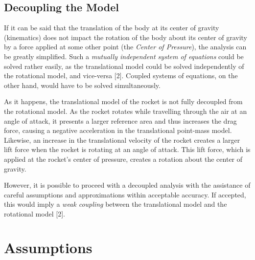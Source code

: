 \documentclass[]{book}
\begin{document}
\subsection{Decoupling the Model}\label{decoupling-the-model}

If it can be said that the translation of the body at its center of
gravity (kinematics) does not impact the rotation of the body about its
center of gravity by a force applied at some other point (the
\emph{Center of Pressure}), the analysis can be greatly simplified. Such
a \emph{mutually independent system of equations} could be solved rather
easily, as the translational model could be solved independently of the
rotational model, and vice-versa {[}2{]}. Coupled systems of equations,
on the other hand, would have to be solved simultaneously.

As it happens, the translational model of the rocket is not fully
decoupled from the rotational model. As the rocket rotates while
travelling through the air at an angle of attack, it presents a larger
reference area and thus increases the drag force, causing a negative
acceleration in the translational point-mass model. Likewise, an
increase in the translational velocity of the rocket creates a larger
lift force when the rocket is rotating at an angle of attack. This lift
force, which is applied at the rocket's center of pressure, creates a
rotation about the center of gravity.

However, it is possible to proceed with a decoupled analysis with the
assistance of careful assumptions and approximations within acceptable
accuracy. If accepted, this would imply a \emph{weak coupling} between
the translational model and the rotational model {[}2{]}.

\section{Assumptions}\label{assumptions}
\end{document}
